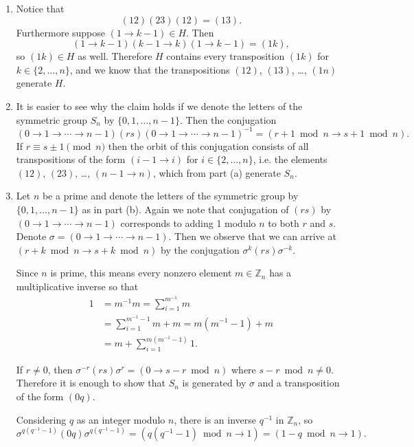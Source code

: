 \documentclass{article}
\begin{document}
\begin{Answer}
\begin{enumerate}
  \item{
    Notice that
    $$
    (12)(23)(12) = (13).
    $$
    Furthermore suppose $(1 \to k - 1) \in H$. Then
    $$
    (1 \to k - 1)(k - 1 \to k)(1 \to k - 1) =
    (1k),
    $$
    so $(1k) \in H$ as well.
    Therefore $H$ contains every transposition $(1k)$ for
    $k \in \{ 2, \dots, n \}$, and we know that the transpositions
    $(12)$, $(13)$, \dots, $(1n)$ generate $H$.
  }
  \item{
    It is easier to see why the claim holds if we
    denote the letters of the symmetric group $S_n$ by $\{0, 1, \dots,
    n-1\}$. Then the conjugation
    $$
    (0 \to 1 \to \cdots \to n-1)
    (rs)
    (0 \to 1 \to \cdots \to n-1)^{-1} =
    (r + 1 \bmod n \to s + 1 \bmod n).
    $$
    If $r \equiv s \pm 1 \pmod{n}$ then the orbit of this conjugation consists of
    all transpositions of the form $(i-1 \to i)$ for $i \in \{2, \dots,
    n\}$, i.e. the elements
    $(12)$, $(23)$, \dots, $(n-1 \to n)$, which from part (a)
    generate $S_n$.
  }
  \item{
    Let $n$ be a prime and denote the letters of the symmetric group
    by $\{0, 1, \dots, n - 1\}$ as in part (b). Again we note that
    conjugation of $(rs)$ by $(0 \to 1 \to \cdots \to n-1)$
    corresponds to adding 1 modulo $n$ to both $r$ and $s$.
    Denote $\sigma = (0 \to 1 \to \cdots \to n-1)$. Then we observe
    that we can arrive at $(r + k \bmod n \to s + k \bmod n)$ by
    the conjugation $\sigma^k (rs) \sigma^{-k}$.

    Since $n$ is prime, this means every
    nonzero element $m \in \mathbb{Z}_n$ has a multiplicative inverse so that
    \begin{align*}
    1 &= m^{-1} m
       = \sum_{i=1}^{m^{-1}} m \\
      &= \sum_{i=1}^{m^{-1} - 1} m + m
       = m(m^{-1} - 1) + m \\
      &= m + \sum_{i=1}^{m(m^{-1} - 1)} 1.
    \end{align*}

    If $r \neq 0$, then
    $\sigma^{-r}(rs)\sigma^{r} = (0 \to s - r \bmod n)$ where
    $s - r \bmod n \neq 0$. Therefore it is enough to show that
    $S_n$ is generated by $\sigma$ and a transposition
    of the form $(0q)$.

    Considering $q$ as an integer modulo $n$, there is an inverse $q^{-1}$ in
    $\mathbb{Z}_n$, so
    $$
    \sigma^{q(q^{-1} - 1)} (0q) \sigma^{q(q^{-1} - 1)}
      = (q(q^{-1} - 1) \bmod n \to 1)
      = (1 - q \bmod n \to 1).
    $$

}
\end{enumerate}
\end{Answer}
\end{document}
